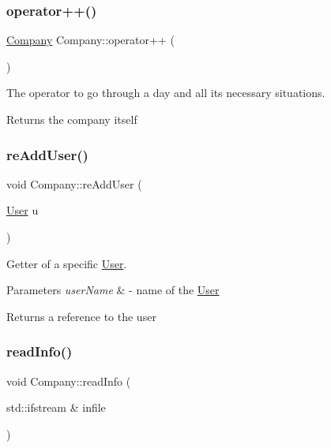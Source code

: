 \subsubsection{\texorpdfstring{operator++()}{operator++()}}
{\footnotesize\ttfamily \mbox{\hyperlink{class_company}{Company}} Company\+::operator++ (\begin{DoxyParamCaption}{ }\end{DoxyParamCaption})}



The operator to go through a day and all its necessary situations. 

\begin{DoxyReturn}{Returns}
the company itself 
\end{DoxyReturn}
\mbox{\label{class_company_acbd7b1d6be4ae5e3322add41e2be256e}} 
\subsubsection{\texorpdfstring{re\+Add\+User()}{reAddUser()}}
{\footnotesize\ttfamily void Company\+::re\+Add\+User (\begin{DoxyParamCaption}\item[{\mbox{\hyperlink{class_user}{User}}}]{u }\end{DoxyParamCaption})}



Getter of a specific \mbox{\hyperlink{class_user}{User}}. 


\begin{DoxyParams}{Parameters}
{\em user\+Name} & -\/ name of the \mbox{\hyperlink{class_user}{User}} \\
\hline
\end{DoxyParams}
\begin{DoxyReturn}{Returns}
a reference to the user 
\end{DoxyReturn}
\mbox{\label{class_company_a2b97cd4ed80ecab0aa92d0f9c1f81071}} 
\subsubsection{\texorpdfstring{read\+Info()}{readInfo()}}
{\footnotesize\ttfamily void Company\+::read\+Info (\begin{DoxyParamCaption}\item[{std\+::ifstream \&}]{infile }\end{DoxyParamCaption})}



